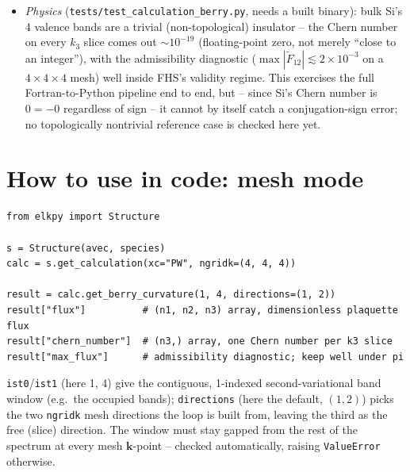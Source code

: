 \documentclass[11pt]{article}
\begin{document}
\begin{itemize}
    the overlap of $\Gamma$ with itself via a full reciprocal lattice vector, on a
    $1\times1\times1$ mesh, which should trivially equal the identity matrix) did not
    hold, traced to an apparent limitation of \texttt{getevecfv}'s G-vector relabelling
    for that specific degenerate case -- not exercised by any real calculation, since
    \texttt{elkpy\_berry.f90} now rejects \texttt{ngridk}$<2$ in either loop direction
    outright (a single mesh point gives a zero-area plaquette regardless). A real
    multi-point mesh ($2\times2\times2$) showed consistent $|\det M|$ across both
    boundary-wrapping and non-wrapping neighbour pairs, evidence against (though not
    proof against) the same issue affecting realistic usage.
  \item \emph{Physics} (\texttt{tests/test\_calculation\_berry.py}, needs a built
    binary): bulk Si's 4 valence bands are a trivial (non-topological) insulator --
    the Chern number on every $k_3$ slice comes out $\sim 10^{-19}$ (floating-point
    zero, not merely ``close to an integer''), with the admissibility diagnostic
    ($\max|\tilde F_{12}|\lesssim 2\times 10^{-3}$ on a $4\times4\times4$ mesh) well
    inside FHS's validity regime. This exercises the full Fortran-to-Python pipeline
    end to end, but -- since Si's Chern number is $0=-0$ regardless of sign -- it
    cannot by itself catch a conjugation-sign error; no topologically nontrivial
    reference case is checked here yet.
\end{itemize}

\section{How to use in code: mesh mode}

\begin{verbatim}
from elkpy import Structure

s = Structure(avec, species)
calc = s.get_calculation(xc="PW", ngridk=(4, 4, 4))

result = calc.get_berry_curvature(1, 4, directions=(1, 2))
result["flux"]          # (n1, n2, n3) array, dimensionless plaquette flux
result["chern_number"]  # (n3,) array, one Chern number per k3 slice
result["max_flux"]      # admissibility diagnostic; keep well under pi
\end{verbatim}
\texttt{ist0}/\texttt{ist1} (here 1, 4) give the contiguous, 1-indexed
second-variational band window (e.g.\ the occupied bands); \texttt{directions}
(here the default, $(1,2)$) picks the two \texttt{ngridk} mesh directions the loop is
built from, leaving the third as the free (slice) direction. The window must stay
gapped from the rest of the spectrum at every mesh $\mathbf k$-point -- checked
automatically, raising \texttt{ValueError} otherwise.
\end{document}
